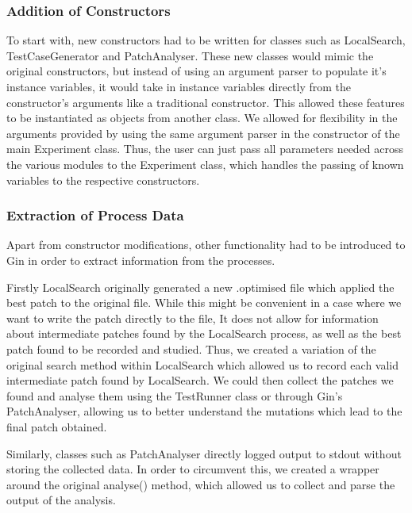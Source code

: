 \documentclass[titlepage]{article}
\begin{document}
\subsubsection{Addition of Constructors}
To start with, new constructors had to be written for classes such as  LocalSearch, TestCaseGenerator and PatchAnalyser. These new classes would mimic the original constructors, but instead of using an argument parser to populate it’s instance variables, it would take in instance variables directly from the constructor’s arguments like a traditional constructor. This allowed these features to be instantiated as objects from another class. We allowed for flexibility in the arguments provided by using the same argument parser in the constructor of the main Experiment class. Thus, the user can just pass all parameters needed across the various modules to the Experiment class, which handles the passing of known variables to the respective constructors. 


\subsubsection{Extraction of Process Data}
Apart from constructor modifications, other functionality had to be introduced to Gin in order to extract information from the processes. 

Firstly LocalSearch originally generated a new .optimised file which applied the best patch to the original file. While this might be convenient in a case where we want to write the patch directly to the file, It does not allow for information about intermediate patches found by the LocalSearch process, as well as the best patch found to be recorded and studied. Thus, we created a variation of the original search method within LocalSearch which allowed us to record each valid intermediate patch found by LocalSearch. We could then collect the patches we found and analyse them using the TestRunner class or through Gin’s PatchAnalyser, allowing us to better understand the mutations which lead to the final patch obtained. 

Similarly, classes such as PatchAnalyser directly logged output to stdout without storing the collected data. In order to circumvent this, we created a wrapper around the original analyse() method, which allowed us to collect and parse the output of the analysis. 
\end{document}
